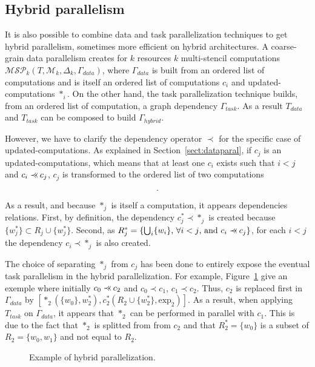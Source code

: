 \subsection{Hybrid parallelism}
It is also possible to combine data and task parallelization techniques to get hybrid parallelism, sometimes more efficient on hybrid architectures. A coarse-grain data parallelism creates for $k$ resources $k$ multi-stencil computations $\mathcal{MSP}_k(T,\mathcal{M}_k,\Delta_k,\Gamma_{data})$, where $\Gamma_{data}$ is built from an ordered list of computations and is itself an ordered list of computations $c_i$ and updated-computations $*_i$. On the other hand, the task parallelization technique builds, from an ordered list of computation, a graph dependency $\Gamma_{task}$. As a result $T_{data}$ and $T_{task}$ can be composed to build $\Gamma_{hybrid}$. 

However, we have to clarify the dependency operator $\prec$ for the specific case of updated-computations. As explained in Section~\ref{sect:dataparal}, if $c_j$ is an updated-computations, which means that at least one $c_i$ exists such that $i<j$ and $c_i \pprec c_j$, $c_j$ is transformed to the ordered list of two computations

\begin{equation*}
[*_j(R^*_j,w^*_j),c^*_j(R_j \cup \{w^*_j\},w_j,\text{exp}_j)].
\end{equation*}

As a result, and because $*_j$ is itself a computation, it appears dependencies relations. First, by definition, the dependency $c^*_j \prec *_j$ is created because $\{w^*_j\} \subset R_j \cup \{w^*_j\}$. Second, as $R^*_j = \{\bigcup_{i} \{w_i\} \text{, }\forall i<j\text{, and }c_i \pprec c_j\}$, for each $i<j$ the dependency $c_i \prec *_j$ is also created.

The choice of separating $*_j$ from $c_j$ has been done to entirely expose the eventual task parallelism in the hybrid parallelization. For example, Figure~\ref{fig:more} give an exemple where initially $c_0 \pprec c_2$ and $c_0 \prec c_1$, $c_1 \prec c_2$. Thus, $c_2$ is replaced first in $\Gamma_{data}$ by $[*_2(\{w_0\},w^*_2),c^*_2(R_2 \cup \{w^*_2\},\text{exp}_2)]$. As a result, when applying $T_{task}$ on $\Gamma_{data}$, it appears that $*_2$ can be performed in parallel with $c_1$. This is due to the fact that $*_2$ is splitted from from $c_2$ and that $R^*_2=\{w_0\}$ is a subset of $R_2=\{w_0,w_1\}$ and not equal to $R_2$.

\begin{figure}[h!]
\begin{center}
  \caption{Example of hybrid parallelization.}
  \label{fig:more}
\end{center}
\end{figure}

